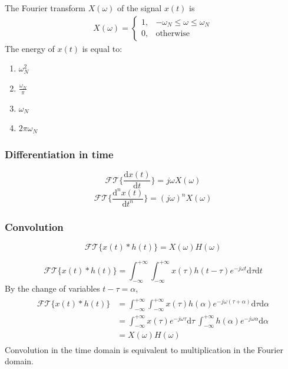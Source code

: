 \begin{q}{}
The Fourier transform $X(\omega)$ of the signal $x(t)$ is
\begin{align*}
    X(\omega) =
    \begin{cases}
    1, & -\omega_{N} \leq \omega \leq \omega_{N} \\
    0, & \text{otherwise}
    \end{cases}
\end{align*}
The energy of $x(t)$ is equal to:
\begin{multicols}{2}
\begin{enumerate}[label=(\alph*)]
    \item $\omega_{N}^{2}$
    \item $\frac{\omega_{N}}{\pi}$
    \item $\omega_{N}$
    \item $2\pi\omega_{N}$
\end{enumerate}
\end{multicols}
\end{q}

\subsubsection{Differentiation in time}
\[ 
\mathcal{FT} \bigg\{ \frac{\mathrm{d}x(t)}{\mathrm{d}t} \bigg\} = j\omega X(\omega) 
\]
\[ 
\mathcal{FT} \bigg\{ \frac{\mathrm{d}^{n}x(t)}{\mathrm{d}t^{n}} \bigg\} = (j\omega)^{n} X(\omega) 
\]

\subsubsection{Convolution}
\[ 
\mathcal{FT}\{ x(t)*h(t) \} = X(\omega)H(\omega) 
\]

\begin{dv}{}
    \[ 
    \mathcal{FT}\{ x(t)*h(t)\} = \int_{-\infty}^{+\infty}\int_{-\infty}^{+\infty} x(\tau)h(t-\tau)e^{-j\omega t}\mathrm{d}\tau \mathrm{d}t 
    \]
    By the change of variables $t-\tau = \alpha$,
    \begin{align*} 
    \begin{split}
        \mathcal{FT}\{ x(t)*h(t)\} &= \int_{-\infty}^{+\infty}\int_{-\infty}^{+\infty} x(\tau)h(\alpha)e^{-j\omega (\tau+\alpha)}\mathrm{d}\tau \mathrm{d}\alpha \\
        &=\int_{-\infty}^{+\infty}x(\tau)e^{-j\omega \tau}\mathrm{d}\tau \ \int_{-\infty}^{+\infty}h(\alpha)e^{-j\omega \alpha}\mathrm{d}\alpha\\
        &= X(\omega)H(\omega)
     \end{split} 
     \end{align*}
     Convolution in the time domain is equivalent to multiplication in the Fourier domain.
\end{dv}


